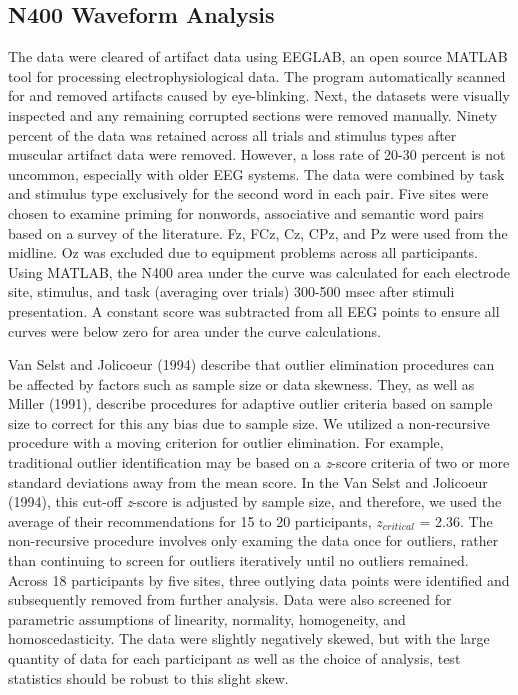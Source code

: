 \documentclass[english,man]{apa6}
\theoremstyle{definition}
\theoremstyle{definition}
\theoremstyle{definition}
\theoremstyle{remark}
\begin{document}
\subsection{N400 Waveform Analysis}\label{n400-waveform-analysis}

The data were cleared of artifact data using EEGLAB, an open source
MATLAB tool for processing electrophysiological data. The program
automatically scanned for and removed artifacts caused by eye-blinking.
Next, the datasets were visually inspected and any remaining corrupted
sections were removed manually. Ninety percent of the data was retained
across all trials and stimulus types after muscular artifact data were
removed. However, a loss rate of 20-30 percent is not uncommon,
especially with older EEG systems. The data were combined by task and
stimulus type exclusively for the second word in each pair. Five sites
were chosen to examine priming for nonwords, associative and semantic
word pairs based on a survey of the literature. Fz, FCz, Cz, CPz, and Pz
were used from the midline. Oz was excluded due to equipment problems
across all participants. Using MATLAB, the N400 area under the curve was
calculated for each electrode site, stimulus, and task (averaging over
trials) 300-500 msec after stimuli presentation. A constant score was
subtracted from all EEG points to ensure all curves were below zero for
area under the curve calculations.

Van Selst and Jolicoeur (1994) describe that outlier elimination
procedures can be affected by factors such as sample size or data
skewness. They, as well as Miller (1991), describe procedures for
adaptive outlier criteria based on sample size to correct for this any
bias due to sample size. We utilized a non-recursive procedure with a
moving criterion for outlier elimination. For example, traditional
outlier identification may be based on a \emph{z}-score criteria of two
or more standard deviations away from the mean score. In the Van Selst
and Jolicoeur (1994), this cut-off \emph{z}-score is adjusted by sample
size, and therefore, we used the average of their recommendations for 15
to 20 participants, \(z_{critical}\) = 2.36. The non-recursive procedure
involves only examing the data once for outliers, rather than continuing
to screen for outliers iteratively until no outliers remained. Across 18
participants by five sites, three outlying data points were identified
and subsequently removed from further analysis. Data were also screened
for parametric assumptions of linearity, normality, homogeneity, and
homoscedasticity. The data were slightly negatively skewed, but with the
large quantity of data for each participant as well as the choice of
analysis, test statistics should be robust to this slight skew.
\end{document}
